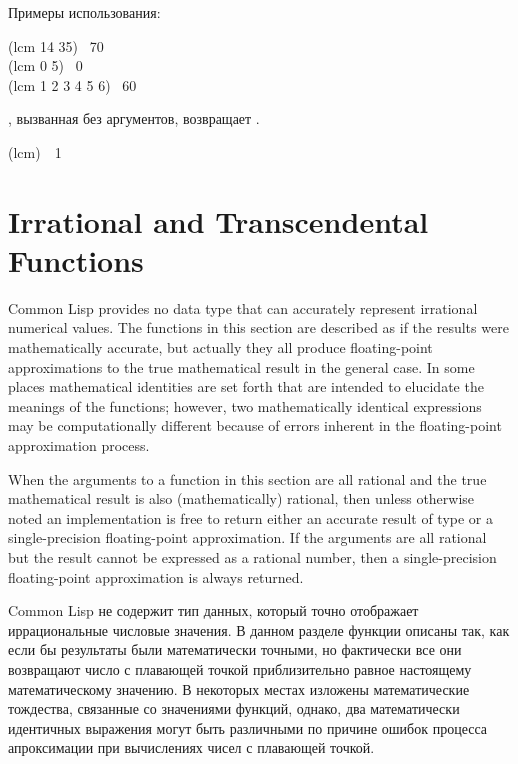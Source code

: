 \begin{defun}[Function]
Примеры использования:
\begin{lisp}
(lcm 14 35) \EV\ 70 \\
(lcm 0 5) \EV\ 0 \\
(lcm 1 2 3 4 5 6) \EV\ 60
\end{lisp}


, вызванная без аргументов, возвращает .
\begin{lisp}
(lcm)~\EV~1
\end{lisp}
\end{defun}

\section{Irrational and Transcendental Functions}
\label{TRANSCENDENTAL-SECTION}

Common Lisp provides no data type that can accurately represent irrational
numerical values.
The functions in this section are described as if the results
were mathematically accurate, but actually they all produce floating-point
approximations to the true mathematical result in the general case.
In some places
mathematical identities are set forth that are intended to elucidate the
meanings of the functions; however, two mathematically identical
expressions may be computationally different because of errors
inherent in the floating-point approximation process.

When the arguments to
a function in this section are all rational and the true mathematical result
is also (mathematically) rational, then unless otherwise noted
an implementation is free to return either an accurate result of
type  or a single-precision floating-point approximation.
If the arguments are all rational but the result cannot be expressed
as a rational number, then a single-precision floating-point
approximation is always returned.

Common Lisp не содержит тип данных, который точно отображает иррациональные
числовые значения.
В данном разделе функции описаны так, как если бы результаты были математически
точными, но фактически все они возвращают число с плавающей точкой
приблизительно равное настоящему математическому значению.
В некоторых местах изложены математические тождества, связанные со значениями
функций, однако, два математически идентичных выражения могут быть различными
по причине ошибок процесса апроксимации при вычислениях чисел с плавающей
точкой.

